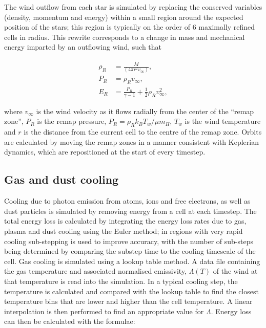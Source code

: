 \documentclass[fleqn,usenatbib]{mnras}
\begin{document}
The wind outflow from each star is simulated by replacing the conserved variables (density, momentum and energy) within a small region around the expected position of the stars; this region is typically on the order of 6 maximally refined cells in radius.
This rewrite corresponds to a change in mass and mechanical energy imparted by an outflowing wind, such that

\begin{subequations}
  \begin{align}
    \rho_R & = \frac{\dot M}{(4 \pi r^2 v_\infty)} , \\
    P_{R}  & = \rho_R v_\infty , \\
    E_R    & = \frac{P_R}{\gamma - 1} + \frac{1}{2} \rho_{R} v_\infty^2 ,
  \end{align}
\end{subequations}

\noindent
where $v_\infty$ is the wind velocity as it flows radially from the center of the ``remap zone'', $P_R$ is the remap pressure, $P_R = \rho_R k_B T_w / \mu m_H$, $T_w$ is the wind temperature and $r$ is the distance from the current cell to the centre of the remap zone.
Orbits are calculated by moving the remap zones in a manner consistent with Keplerian dynamics, which are repositioned at the start of every timestep.


\subsection{Gas and dust cooling} \label{sec:gas-dust-cooling}

Cooling due to photon emission from atoms, ions and free electrons, as well as dust particles is simulated by removing energy from a cell at each timestep.
The total energy loss is calculated by integrating the energy loss rates due to gas, plasma and dust cooling using the Euler method; in regions with very rapid cooling sub-stepping is used to improve accuracy, with the number of sub-steps being determined by comparing the substep time to the cooling timescale of the cell.
Gas cooling is simulated using a lookup table method.
A data file containing the gas temperature and associated normalised emissivity, $\Lambda(T)$ of the wind at that temperature is read into the simulation.
In a typical cooling step, the temperature is calculated and compared with the lookup table to find the closest temperature bins that are lower and higher than the cell temperature.
A linear interpolation is then performed to find an appropriate value for $\Lambda$.
Energy loss can then be calculated with the formulae:
\end{document}
